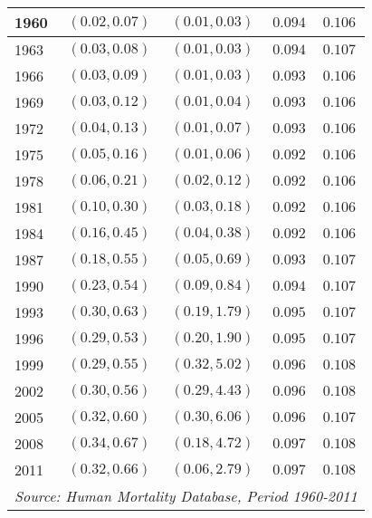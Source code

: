 \documentclass[12pt, titlepage]{article}%
\begin{document}
\begin{table}
\begin{center}
\begin{tabular}{||l||c|c||c|c||}
  1960 &  $(0.02,0.07)$& $(0.01,0.03)$& $0.094$ & $0.106$  \\ \hline\hline
  1963 &  $(0.03,0.08)$& $(0.01,0.03)$& $0.094$ & $0.107$  \\ \hline\hline
  1966 &  $(0.03,0.09)$& $(0.01,0.03)$& $0.093$ & $0.106$  \\ \hline\hline
  1969 &  $(0.03,0.12)$& $(0.01,0.04)$& $0.093$ & $0.106$  \\ \hline\hline
  1972 &  $(0.04,0.13)$& $(0.01,0.07)$& $0.093$ & $0.106$  \\ \hline\hline
  1975 &  $(0.05,0.16)$& $(0.01,0.06)$& $0.092$ & $0.106$  \\ \hline\hline
  1978 &  $(0.06,0.21)$& $(0.02,0.12)$& $0.092$ & $0.106$  \\ \hline\hline
  1981 &  $(0.10,0.30)$& $(0.03,0.18)$& $0.092$ & $0.106$  \\ \hline\hline
  1984 &  $(0.16,0.45)$& $(0.04,0.38)$& $0.092$ & $0.106$  \\ \hline\hline
  1987 &  $(0.18,0.55)$& $(0.05,0.69)$& $0.093$ & $0.107$  \\ \hline\hline
  1990 &  $(0.23,0.54)$& $(0.09,0.84)$& $0.094$ & $0.107$  \\ \hline\hline
  1993 &  $(0.30,0.63)$& $(0.19,1.79)$& $0.095$ & $0.107$  \\ \hline\hline
  1996 &  $(0.29,0.53)$& $(0.20,1.90)$& $0.095$ & $0.107$  \\ \hline\hline
  1999 &  $(0.29,0.55)$& $(0.32,5.02)$& $0.096$ & $0.108$  \\ \hline\hline
  2002 &  $(0.30,0.56)$& $(0.29,4.43)$& $0.096$ & $0.108$  \\ \hline\hline
  2005 &  $(0.32,0.60)$& $(0.30,6.06)$& $0.096$ & $0.107$  \\ \hline\hline
  2008 &  $(0.34,0.67)$& $(0.18,4.72)$& $0.097$ & $0.108$  \\ \hline\hline
  2011 &  $(0.32,0.66)$& $(0.06,2.79)$& $0.097$ & $0.108$  \\ \hline\hline
     
\multicolumn{5}{||r||}{{\em Source: Human Mortality Database, Period 1960-2011}} \\ \hline\hline
\end{tabular}
\label{lab2}
\smallskip
\end{center}
\end{table}
\end{document}
